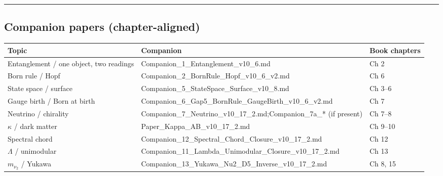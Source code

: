 \documentclass[
  11pt,
]{article}
\newcounter{none} %
\begin{document}
\begin{center}\rule{0.5\linewidth}{0.5pt}\end{center}

\subsection{Companion papers
(chapter-aligned)}\label{companion-papers-chapter-aligned}

{\def\LTcaptype{none} %
\begin{longtable}[]{@{}
  >{\raggedright\arraybackslash}p{}
  >{\raggedright\arraybackslash}p{}
  >{\raggedright\arraybackslash}p{}@{}}
\toprule\noalign{}
\begin{minipage}[b]{\linewidth}\raggedright
Topic
\end{minipage} & \begin{minipage}[b]{\linewidth}\raggedright
Companion
\end{minipage} & \begin{minipage}[b]{\linewidth}\raggedright
Book chapters
\end{minipage} \\
\midrule\noalign{}
\endhead
\bottomrule\noalign{}
\endlastfoot
Entanglement / one object, two readings &
Companion\_1\_Entanglement\_v10\_6.md & Ch 2 \\
Born rule / Hopf & Companion\_2\_BornRule\_Hopf\_v10\_6\_v2.md & Ch 6 \\
State space / surface & Companion\_5\_StateSpace\_Surface\_v10\_8.md &
Ch 3--6 \\
Gauge birth / Born at birth &
Companion\_6\_Gap5\_\newline BornRule\_GaugeBirth\_v10\_6\_v2.md & Ch
7 \\
Neutrino / chirality &
Companion\_7\_Neutrino\_v10\_17\_2.md;\newline Companion\_7a\_* (if
present) & Ch 7--8 \\
\(\kappa\) / dark matter & Paper\_Kappa\_AB\_v10\_17\_2.md & Ch 9--10 \\
Spectral chord &
Companion\_12\_Spectral\_Chord\_Closure\_\newline v10\_17\_2.md & Ch
12 \\
\(\Lambda\) / unimodular &
Companion\_11\_Lambda\_Unimodular\_Closure\_\newline v10\_17\_2.md & Ch
13 \\
\(m_{\nu_2}\) / Yukawa &
Companion\_13\_Yukawa\_Nu2\_D5\_Inverse\_\newline v10\_17\_2.md & Ch 8,
15 \\
\end{longtable}
}
\end{document}
